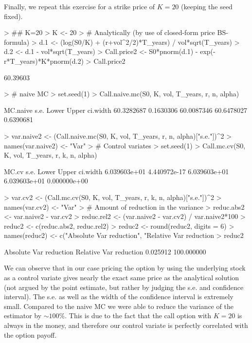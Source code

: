 \documentclass{article}
\begin{document}
\vspace{16pt}
Finally, we repeat this exercise for a strike price of $K = 20$ (keeping the seed fixed).
\begin{Schunk}
\begin{Sinput}
> ## K=20
> K <- 20
> # Analytically (by use of closed-form price BS-formula)
> d.1 <- (log(S0/K) + (r+vol^2/2)*T_years) / vol*sqrt(T_years)
> d.2 <- d.1 - vol*sqrt(T_years)
> Call.price2 <- S0*pnorm(d.1) - exp(-r*T_years)*K*pnorm(d.2)
> Call.price2
\end{Sinput}
\begin{Soutput}
[1] 60.39603
\end{Soutput}
\begin{Sinput}
> # naive MC
> set.seed(1)
> Call.naive.mc(S0, K, vol, T_years, r, n, alpha)
\end{Sinput}
\begin{Soutput}
  MC.naive       s.e.      Lower      Upper   ci.width 
60.3282687  0.1630306 60.0087346 60.6478027  0.6390681 
\end{Soutput}
\begin{Sinput}
> var.naive2 <- (Call.naive.mc(S0, K, vol, T_years, r, n, alpha)["s.e."])^2
> names(var.naive2) <- "Var"
> # Control variates
> set.seed(1)
> Call.mc.cv(S0, K, vol, T_years, r, k, n, alpha)
\end{Sinput}
\begin{Soutput}
       MC.cv         s.e.        Lower        Upper     ci.width 
6.039603e+01 4.440972e-17 6.039603e+01 6.039603e+01 0.000000e+00 
\end{Soutput}
\begin{Sinput}
> var.cv2 <- (Call.mc.cv(S0, K, vol, T_years, r, k, n, alpha)["s.e."])^2
> names(var.cv2) <- "Var"
> # Amount of reduction in the variance
> reduc.abs2 <- var.naive2 - var.cv2
> reduc.rel2 <- (var.naive2 - var.cv2) / var.naive2*100
> reduc2 <- c(reduc.abs2, reduc.rel2)
> reduc2  <- round(reduc2, digits = 6)
> names(reduc2) <- c("Absolute Var reduction", "Relative Var reduction %")
> reduc2
\end{Sinput}
\begin{Soutput}
  Absolute Var reduction Relative Var reduction % 
                0.025912               100.000000 
\end{Soutput}
\end{Schunk}
We can observe that in our case pricing the option by using the underlying stock as a control variate gives nearly the exact same price as the analytical solution (not argued by the point estimate, but rather by judging the s.e. and confidence interval). The s.e. as well as the width of the confidence interval is extremely small. Compared to the naive MC we were able to reduce the variance of the estimator by $\sim 100\%$. This is due to the fact that the call option with $K=20$ is always in the money, and therefore our control variate is perfectly correlated with the option payoff. \\
\end{document}
